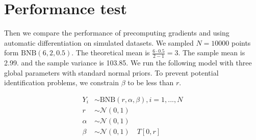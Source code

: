 \documentclass[11pt]{article}
\begin{document}
\begin{comment}
\section{Return check}
We implement these functions in python, and then check whether the running results in Stan meet our expectations.



\begin{lstlisting}[language=python, style=lgeneral]
import numpy as np
import scipy.stats as stats
from scipy.special import betaln, gammaln, zeta

def beta_neg_binomial_pmf(y, r, a, b):
    lprobs = betaln(r+y,a+b) - betaln(r,a) + gammaln(y+b) - gammaln(y+1) - gammaln(b)
    return np.exp(lprobs)

def beta_neg_binomial_cdf(y, r, a, b):
    cdfs = np.zeros(len(y))
    for i, yi in enumerate(y):
        cdfs[i] = np.sum(beta_neg_binomial_pmf(np.arange(yi+1), r, a, b))
    return cdfs

def beta_neg_binomial_rng(r, alpha, beta, size=1, seed=None):
    if seed is not None:
        np.random.seed(seed)
    p = stats.beta.rvs(alpha, beta, size=size)
    # N Number of successes, p probability of success
    return stats.nbinom.rvs(n=r, p=p)
\end{lstlisting}
\end{comment}




\section{Performance test}



Then we compare the performance of precomputing gradients and using automatic differentiation on simulated datasets. We sampled $N=10000$ points form $\text{BNB}(6,2,0.5)$. The theoretical mean is $\frac{6\cdot 0.5}{2-1}=3$. The sample mean is 2.99.  and the sample variance is 103.85.  We run the following model with three global parameters with standard normal priors. To prevent potential identification problems, we constrain $\beta$ to be less than $r$.

\begin{equation}
  \begin{aligned}
	Y_{i} &\sim \text{BNB}(r, \alpha, \beta), i=1,...,N\\
	r &\sim \mathcal{N}(0,1) \\
	\alpha &\sim \mathcal{N}(0,1) \\ 
	\beta &\sim \mathcal{N}(0,1) \quad T[0,r]
  \end{aligned}
\end{equation}
\end{document}
